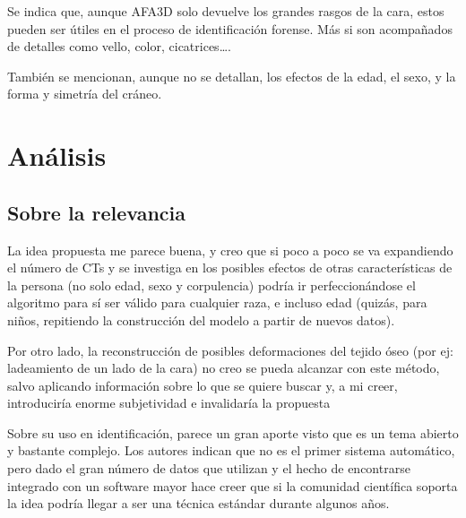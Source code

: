 \documentclass[13pt,a4paper]{article}
\begin{document}
Se indica que, aunque AFA3D solo devuelve los grandes rasgos de la cara, estos pueden ser útiles en el proceso de identificación forense. Más si son acompañados de detalles como vello, color, cicatrices\dots.

También se mencionan, aunque no se detallan, los efectos de la edad, el sexo, y la forma y simetría del cráneo.



\section{Análisis}

\subsection{Sobre la relevancia}

La idea propuesta me parece buena, y creo que si poco a poco se va expandiendo el número de CTs y se investiga en los posibles efectos de otras características de la persona (no solo edad, sexo y corpulencia) podría ir perfeccionándose el algoritmo para sí ser válido para cualquier raza, e incluso edad (quizás, para niños, repitiendo la construcción del modelo a partir de nuevos datos).

Por otro lado, la reconstrucción de posibles deformaciones del tejido óseo (por ej: ladeamiento de un lado de la cara) no creo se pueda alcanzar con este método, salvo aplicando información sobre lo que se quiere buscar y, a mi creer, introduciría enorme subjetividad e invalidaría la propuesta


\vspace{\baselineskip}


Sobre su uso en identificación, parece un gran aporte visto que es un tema abierto y bastante complejo. Los autores indican que no es el primer sistema automático, pero dado el gran número de datos que utilizan y el hecho de encontrarse integrado con un software mayor hace creer que si la comunidad científica soporta la idea podría llegar a ser una técnica estándar durante algunos años.
\end{document}
